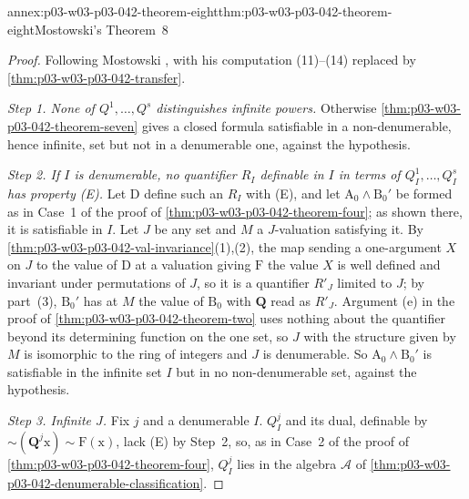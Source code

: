 \begin{annexitem}{annex:p03-w03-p03-042-theorem-eight}{thm:p03-w03-p03-042-theorem-eight}{Mostowski's Theorem~8}
\begin{proof}
Following Mostowski \cite[pp.~26--27]{Mostowski1957}, with his
computation (11)--(14) replaced by \cref{thm:p03-w03-p03-042-transfer}.

\emph{Step 1.  None of \(Q^1,\ldots,Q^s\) distinguishes infinite powers.}
Otherwise \cref{thm:p03-w03-p03-042-theorem-seven} gives a closed formula
satisfiable in a non-denumerable, hence infinite, set but not in a
denumerable one, against the hypothesis.

\emph{Step 2.  If \(I\) is denumerable, no quantifier \(R_I\) definable in
\(I\) in terms of \(Q^1_I,\ldots,Q^s_I\) has property (E).}  Let
\(\mathrm D\) define such an \(R_I\) with (E), and let \(\mathrm A_0\wedge
\mathrm B_0'\) be formed as in Case~1 of the proof of
\cref{thm:p03-w03-p03-042-theorem-four}; as shown there, it is satisfiable
in \(I\).  Let \(J\) be any set and \(M\) a \(J\)-valuation satisfying it.
By \cref{thm:p03-w03-p03-042-val-invariance}(1),(2), the map sending a
one-argument \(X\) on \(J\) to the value of \(\mathrm D\) at a valuation
giving \(\mathrm F\) the value \(X\) is well defined and invariant under
permutations of \(J\), so it is a quantifier \(R'_J\) limited to \(J\); by
part~(3), \(\mathrm B_0'\) has at \(M\) the value of \(\mathrm B_0\) with
\(\mathbf Q\) read as \(R'_J\).  Argument (e) in the proof of
\cref{thm:p03-w03-p03-042-theorem-two} uses nothing about the quantifier
beyond its determining function on the one set, so \(J\) with the
structure given by \(M\) is isomorphic to the ring of integers and \(J\) is
denumerable.  So \(\mathrm A_0\wedge\mathrm B_0'\) is satisfiable in the
infinite set \(I\) but in no non-denumerable set, against the hypothesis.

\emph{Step 3.  Infinite \(J\).}  Fix \(j\) and a denumerable \(I\).
\(Q^j_I\) and its dual, definable by \({\sim}(\mathbf Q^j\mathrm x)
{\sim}\mathrm F(\mathrm x)\), lack (E) by Step~2, so, as in Case~2 of the
proof of \cref{thm:p03-w03-p03-042-theorem-four}, \(Q^j_I\) lies in the
algebra \(\mathcal A\) of
\cref{thm:p03-w03-p03-042-denumerable-classification}.


\end{proof}
\end{annexitem}
